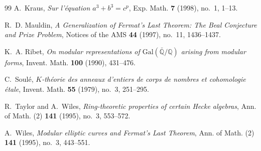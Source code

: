 \documentclass[11pt,reqno]{amsart}
\theoremstyle{definition}
\theoremstyle{remark}
\numberwithin{equation}{section}
\begin{document}
\begin{thebibliography}{99}
A.~Kraus,
\emph{Sur l'\'{e}quation $a^3 + b^3 = c^p$},
Exp. Math. \textbf{7} (1998), no.~1, 1--13.

R.~D. Mauldin,
\emph{A Generalization of Fermat's Last Theorem: The Beal Conjecture and Prize Problem},
Notices of the AMS \textbf{44} (1997), no.~11, 1436--1437.

K.~A. Ribet,
\emph{On modular representations of $\mathrm{Gal}(\bar{\mathbb{Q}}/\mathbb{Q})$ arising from modular forms},
Invent. Math. \textbf{100} (1990), 431--476.

C.~Soul\'{e},
\emph{$K$-th\'{e}orie des anneaux d'entiers de corps de nombres et cohomologie \'{e}tale},
Invent. Math. \textbf{55} (1979), no.~3, 251--295.

R.~Taylor and A.~Wiles,
\emph{Ring-theoretic properties of certain Hecke algebras},
Ann. of Math. (2) \textbf{141} (1995), no.~3, 553--572.

A.~Wiles,
\emph{Modular elliptic curves and Fermat's Last Theorem},
Ann. of Math. (2) \textbf{141} (1995), no.~3, 443--551.

\end{thebibliography}
\end{document}
